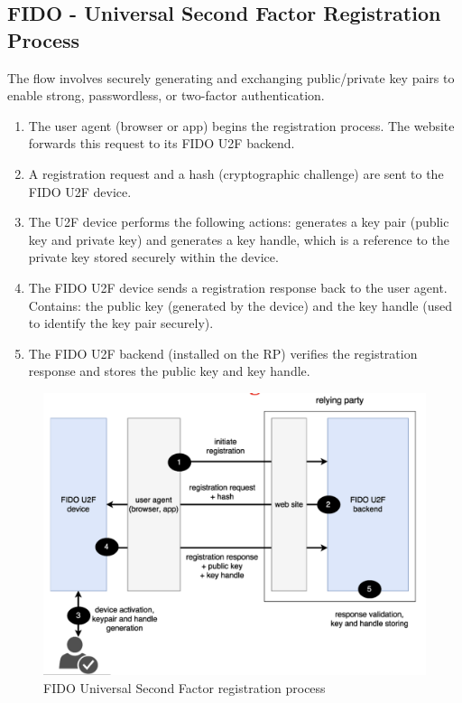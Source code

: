 \subsection*{FIDO - Universal Second Factor Registration Process}
The flow involves securely generating and exchanging public/private key pairs to enable strong, passwordless, or two-factor authentication.
\begin{multicols}{2}

    \begin{enumerate}
        \item The user agent (browser or app) begins the registration process. The website forwards this request to its FIDO U2F backend.
        \item A registration request and a hash (cryptographic challenge) are sent to the FIDO U2F device.
        \item The U2F device performs the following actions: generates a key pair (public key and private key) and generates a key handle, which is a reference to the private key stored securely within the device.
        \item The FIDO U2F device sends a registration response back to the user agent. Contains: the public key (generated by the device) and the key handle (used to identify the key pair securely).
        \item The FIDO U2F backend (installed on the RP) verifies the registration response and stores the public key and key handle.
    \end{enumerate}
\columnbreak

    \begin{figure}[H]
        \centering
        \includegraphics[width=\linewidth]{Images/Authentication/fidoreg.png}
        \caption{FIDO Universal Second Factor registration process}
    \end{figure}
\end{multicols}

